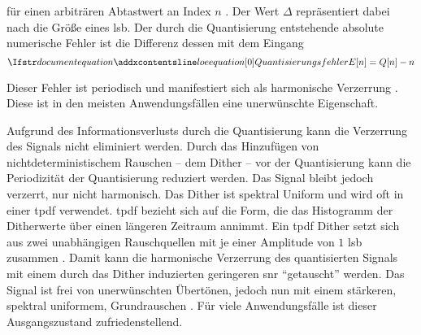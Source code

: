für einen arbiträren Abtastwert an Index $n$ \autocite[S. 500]{dither}.
Der Wert $\Delta$ repräsentiert dabei nach \citeauthor{dither} die Größe eines \gls{lsb}.
Der durch die Quantisierung entstehende absolute numerische Fehler ist die Differenz dessen mit dem Eingang
\begin{equation}
\setequationentry{Quantisierungsfehler}
E[n] = Q[n] - n
\end{equation}

Dieser Fehler ist periodisch und manifestiert sich als harmonische Verzerrung \autocites{dither}{noise-shaping}.
Diese ist in den meisten Anwendungsfällen eine unerwünschte Eigenschaft.

Aufgrund des Informationsverlusts durch die Quantisierung kann die Verzerrung des Signals nicht eliminiert werden.
Durch das Hinzufügen von nichtdeterministischem Rauschen -- dem Dither -- vor der Quantisierung kann die Periodizität der Quantisierung reduziert werden.
Das Signal bleibt jedoch verzerrt, nur nicht harmonisch.
Das Dither ist spektral Uniform und wird oft in einer \gls{tpdf} verwendet.
\gls{tpdf} bezieht sich auf die Form, die das Histogramm der Ditherwerte über einen längeren Zeitraum annimmt.
Ein \gls{tpdf} Dither setzt sich aus zwei unabhängigen Rauschquellen mit je einer Amplitude von $1$ \gls{lsb} zusammen \autocites{dither}[S. 23ff]{dsp-guide}.
Damit kann die harmonische Verzerrung des quantisierten Signals mit einem durch das Dither induzierten geringeren \gls{snr} \enquote{getauscht} werden.
Das Signal ist frei von unerwünschten Übertönen, jedoch nun mit einem stärkeren, spektral uniformem, Grundrauschen \autocites{dither}{noise-shaping}.
Für viele Anwendungsfälle ist dieser Ausgangszustand zufriedenstellend.

